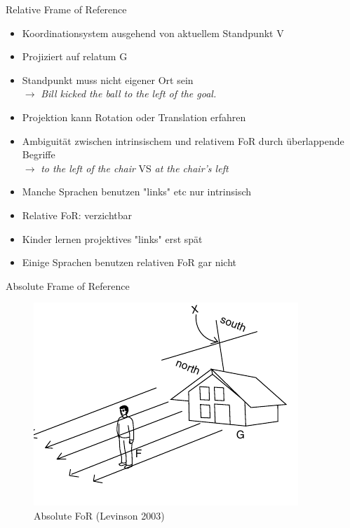 \documentclass[12pt,a4paper]{beamer}
\begin{document}
\begin{frame}{Relative Frame of Reference}
\begin{itemize}
\item Koordinationsystem ausgehend von aktuellem Standpunkt V
\item Projiziert auf relatum G
\item Standpunkt muss nicht eigener Ort sein \\
$\to$ \textit{Bill kicked the ball to the left of the goal.}
\item Projektion kann Rotation oder Translation erfahren
\item Ambiguität zwischen intrinsischem und relativem FoR durch überlappende Begriffe \\
$\to$ \textit{to the left of the chair} VS \textit{at the chair's left}
\item Manche Sprachen benutzen "links" etc nur intrinsisch
\item Relative FoR: verzichtbar
\item Kinder lernen projektives "links" erst spät
\item Einige Sprachen benutzen relativen FoR gar nicht
\end{itemize}
\end{frame}


\begin{frame}{Absolute Frame of Reference}
\begin{figure}
\includegraphics[scale=0.45]{img/levinson_FOR_absolute.png}
\caption{Absolute FoR (Levinson 2003)}
\end{figure}
\end{frame}
\end{document}
